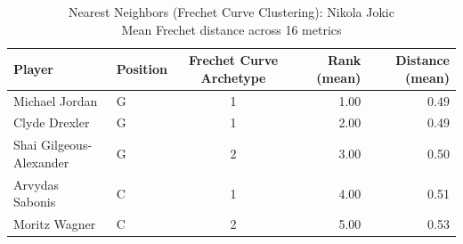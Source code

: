 \begin{table}[t]
\caption*{
{\fontsize{20}{25} Nearest Neighbors (Frechet Curve Clustering): Nikola Jokic\fontsize{12}{15}\selectfont } \\ 
{\fontsize{14}{17}\selectfont  Mean Frechet distance across 16 metrics\fontsize{12}{15}\selectfont }
} 
\fontsize{12.0pt}{14.0pt}\selectfont
\begin{tabular*}{\linewidth}{@{\extracolsep{\fill}}llcrr}
\toprule
Player & Position & Frechet Curve Archetype & Rank (mean) & Distance (mean) \\ 
\midrule\addlinespace[2.5pt]
Michael Jordan & G & 1 & 1.00 & 0.49 \\ 
Clyde Drexler & G & 1 & 2.00 & 0.49 \\ 
Shai Gilgeous-Alexander & G & 2 & 3.00 & 0.50 \\ 
Arvydas Sabonis & C & 1 & 4.00 & 0.51 \\ 
Moritz Wagner & C & 2 & 5.00 & 0.53 \\ 
\bottomrule
\end{tabular*}
\end{table}

